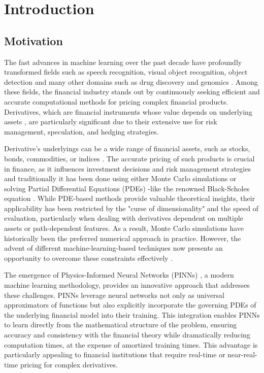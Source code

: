 \documentclass[12pt]{report} %
\theoremstyle{plain}           %
\theoremstyle{definition}      %
\theoremstyle{remark}          %
\begin{document}
\chapter{Introduction}

\section{Motivation}

The fast advances in machine learning over the past decade have profoundly transformed 
fields such as speech recognition, visual object recognition, object detection and many other domains such 
as drug discovery and genomics \cite{lecun}. Among these fields, the financial industry stands out by continuously 
seeking efficient and accurate computational methods for pricing complex financial products. Derivatives, 
which are financial instruments whose value depends on underlying assets \cite{alma99148840908702021}, are particularly 
significant due to their extensive use for risk management, speculation, and hedging  
strategies.

Derivative's underlyings can be a wide range of financial assets, such
as stocks, bonds, commodities, or indices \cite{Wilmott2010PaulWO}. The accurate pricing of such products is crucial in 
finance, as it influences investment decisions and risk management strategies and traditionally it has been done using
either Monte Carlo simulations \cite{glasserman2004monte} or solving Partial Differential 
Equations (PDEs) -like the renowned Black-Scholes equation \cite{blackscholes}. While PDE-based methods provide 
valuable theoretical insights, their applicability has been restricted by the "curse of 
dimensionality" \cite{bellman1966dynamic} and the speed of evaluation, particularly when dealing with derivatives dependent on 
multiple assets or path-dependent features. As a result, Monte Carlo simulations have historically been the 
preferred numerical approach in practice. However, the advent of different 
machine-learning-based techniques now presents an opportunity to overcome these constraints effectively \cite{Han_2018}.

The emergence of Physics-Informed Neural Networks (PINNs) \cite{RAISSI2019686}, a modern machine learning 
methodology, provides an innovative approach that addresses these challenges. PINNs leverage 
neural networks not only as universal approximators of functions but also explicitly 
incorporate the governing PDEs \cite{RAISSI2019686} of the underlying financial model into their training. This 
integration enables PINNs to learn directly from the mathematical structure of the problem, 
ensuring accuracy and consistency with the financial theory while dramatically reducing 
computation times, at the expense of amortized training times. This advantage is particularly appealing 
to financial institutions that require real-time or near-real-time pricing for complex derivatives.
\end{document}
